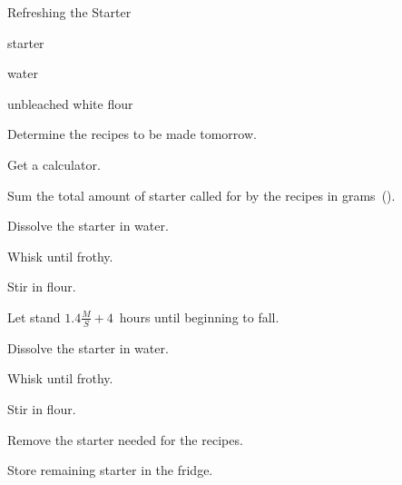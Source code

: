 \begin{recipe}{Refreshing the Starter}{}{}

\begin{ingredients}
\item {} starter
\item water
\item unbleached white flour
\end{ingredients}

\begin{directions}
\item Determine the recipes to be made tomorrow.
\item Get a calculator.
\item Sum the total amount of starter called for by the recipes in grams~().
\item Dissolve the starter in  water.
\item Whisk until frothy.
\item Stir in  flour.
\item Let stand $1.4\frac{M}{S} + 4$~hours until beginning to fall.
\item Dissolve the starter in  water.
\item Whisk until frothy.
\item Stir in  flour.
\item Remove the starter needed for the recipes.
\item Store remaining starter in the fridge.
\end{directions}

\end{recipe}
